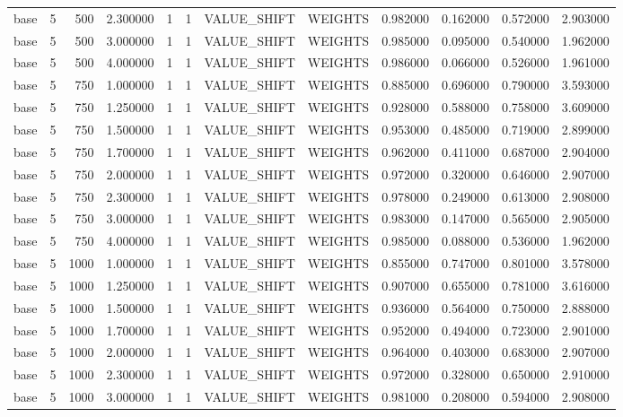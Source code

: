 \begin{tabular}{lrrrllllrrrr}
base & 5 & 500 & 2.300000 & 1 & 1 & VALUE_SHIFT & WEIGHTS & 0.982000 & 0.162000 & 0.572000 & 2.903000 \\
base & 5 & 500 & 3.000000 & 1 & 1 & VALUE_SHIFT & WEIGHTS & 0.985000 & 0.095000 & 0.540000 & 1.962000 \\
base & 5 & 500 & 4.000000 & 1 & 1 & VALUE_SHIFT & WEIGHTS & 0.986000 & 0.066000 & 0.526000 & 1.961000 \\
base & 5 & 750 & 1.000000 & 1 & 1 & VALUE_SHIFT & WEIGHTS & 0.885000 & 0.696000 & 0.790000 & 3.593000 \\
base & 5 & 750 & 1.250000 & 1 & 1 & VALUE_SHIFT & WEIGHTS & 0.928000 & 0.588000 & 0.758000 & 3.609000 \\
base & 5 & 750 & 1.500000 & 1 & 1 & VALUE_SHIFT & WEIGHTS & 0.953000 & 0.485000 & 0.719000 & 2.899000 \\
base & 5 & 750 & 1.700000 & 1 & 1 & VALUE_SHIFT & WEIGHTS & 0.962000 & 0.411000 & 0.687000 & 2.904000 \\
base & 5 & 750 & 2.000000 & 1 & 1 & VALUE_SHIFT & WEIGHTS & 0.972000 & 0.320000 & 0.646000 & 2.907000 \\
base & 5 & 750 & 2.300000 & 1 & 1 & VALUE_SHIFT & WEIGHTS & 0.978000 & 0.249000 & 0.613000 & 2.908000 \\
base & 5 & 750 & 3.000000 & 1 & 1 & VALUE_SHIFT & WEIGHTS & 0.983000 & 0.147000 & 0.565000 & 2.905000 \\
base & 5 & 750 & 4.000000 & 1 & 1 & VALUE_SHIFT & WEIGHTS & 0.985000 & 0.088000 & 0.536000 & 1.962000 \\
base & 5 & 1000 & 1.000000 & 1 & 1 & VALUE_SHIFT & WEIGHTS & 0.855000 & 0.747000 & 0.801000 & 3.578000 \\
base & 5 & 1000 & 1.250000 & 1 & 1 & VALUE_SHIFT & WEIGHTS & 0.907000 & 0.655000 & 0.781000 & 3.616000 \\
base & 5 & 1000 & 1.500000 & 1 & 1 & VALUE_SHIFT & WEIGHTS & 0.936000 & 0.564000 & 0.750000 & 2.888000 \\
base & 5 & 1000 & 1.700000 & 1 & 1 & VALUE_SHIFT & WEIGHTS & 0.952000 & 0.494000 & 0.723000 & 2.901000 \\
base & 5 & 1000 & 2.000000 & 1 & 1 & VALUE_SHIFT & WEIGHTS & 0.964000 & 0.403000 & 0.683000 & 2.907000 \\
base & 5 & 1000 & 2.300000 & 1 & 1 & VALUE_SHIFT & WEIGHTS & 0.972000 & 0.328000 & 0.650000 & 2.910000 \\
base & 5 & 1000 & 3.000000 & 1 & 1 & VALUE_SHIFT & WEIGHTS & 0.981000 & 0.208000 & 0.594000 & 2.908000 \\

\end{tabular}
